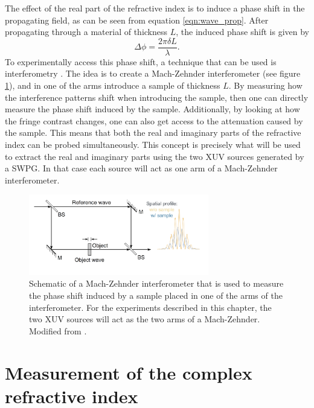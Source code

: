 The effect of the real part of the refractive index is to induce a phase shift in the propagating field, as can be seen from equation \ref{eqn:wave_prop}.  After propagating through a material of thickness $L$, the induced phase shift is given by
\begin{equation}
\label{eqn:phase_shift}
	\Delta\phi=\frac{2\pi\delta L}{\lambda}.
\end{equation}
To experimentally access this phase shift, a technique that can be used is interferometry \cite{hemmersDirectMeasurementComplex2012, hemmersMulticolorXUVInterferometry2009, wilsonDoubleSlitInterferometry2012}. The idea is to create a Mach-Zehnder interferometer (see figure \ref{fig:mach-zehnder_interferometer}), and in one of the arms introduce a sample of thickness $L$. By measuring how the interference patterns shift when introducing the sample, then one can directly measure the phase shift induced by the sample.  Additionally, by looking at how the fringe contrast changes, one can also get access to the attenuation caused by the sample.  This means that both the real and imaginary parts of the refractive index can be probed simultaneously.  This concept is precisely what will be used to extract the real and imaginary parts using the two XUV sources generated by a SWPG.  In that case each source will act as one arm of a Mach-Zehnder interferometer.
\begin{figure}
	\centering
	\includegraphics[width=0.7\textwidth]{figures/refractive_index/mach_zehnder_phase_shift.png}
	\caption[Schematic of Mach-Zehnder interferometer and spatial profile with and without a sample in one arm of the interferometer]{Schematic of a Mach-Zehnder interferometer that is used to measure the phase shift induced by a sample placed in one of the arms of the interferometer.  For the experiments described in this chapter, the two XUV sources will act as the two arms of a Mach-Zehnder.  Modified from \cite{attwoodSoftXraysExtreme2000}.}
	\label{fig:mach-zehnder_interferometer}
\end{figure}

\section{Measurement of the complex refractive index}
